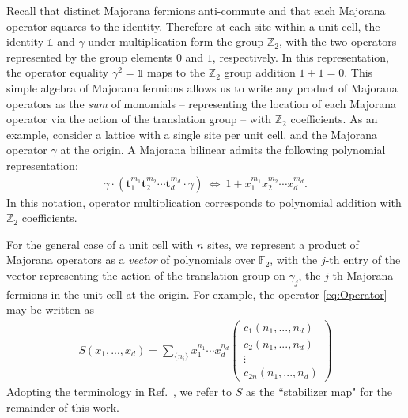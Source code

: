 \documentclass[aps,twocolumn,preprintnumbers,floatfix,showpacs,prx]{revtex4-1}
\begin{document}
Recall that distinct Majorana fermions anti-commute and that each Majorana operator squares to the identity.
Therefore at each site within a unit cell, the identity $\mathds{1}$ and $\gamma$ under multiplication form the group $\mathbb{Z}_{2}$,
with the two operators represented by the group elements $0$ and $1$, respectively. 
In this representation, the operator equality $\gamma^2 = \mathds{1}$
maps to the $\mathbb{Z}_{2}$ group addition $1+ 1=0$.  
This simple algebra of Majorana fermions allows us to write any product of Majorana operators as the {\em sum} of monomials
-- representing the location of each Majorana operator via the action of the translation group -- 
with $\mathbb{Z}_{2}$ coefficients.
As an example, consider a lattice with a single site per unit cell,
and the Majorana operator $\gamma$ at the origin.
A Majorana bilinear admits the following polynomial representation:
\begin{align}
\gamma \cdot 
  \left(\boldsymbol{t}_1^{m_1}\boldsymbol{t}_2^{m_2}\cdots\boldsymbol{t}_d^{m_d}\cdot \gamma \right)
 ~\Longleftrightarrow~
 1 + x_1^{m_1}x_2^{m_2}\cdots x_d^{m_d}.
\end{align}
In this notation, operator multiplication corresponds to polynomial addition with $\mathbb{Z}_2$ coefficients.

For the general case of a unit cell with $n$ sites,%
we represent a product of Majorana operators as a \emph{vector} of polynomials over $\mathbb{F}_{2}$,
with the $j$-th entry of the vector representing the action of the translation group on $\gamma_{j}$,
the $j$-th Majorana fermions in the unit cell at the origin.
For example, the operator \eqref{eq:Operator} may be written as
\begin{align}
S(x_{1}, . . .,x_{d}) = \sum_{\{ n_i \}}x_1^{n_1} \cdots x_d^{n_d}
\begin{pmatrix}
c_{1}(n_{1}, . . ., n_{d})\\
c_{2}(n_{1}, . . ., n_{d})\\
\vdots\\
c_{2n}(n_{1}, . . ., n_{d})
\end{pmatrix}
\label{eq:Operator_Polynomial}
\end{align}
Adopting the terminology in Ref.~\cite{Haah_Commuting_Pauli},
we refer to $S$ as the ``stabilizer map" for the remainder of this work.
\end{document}
